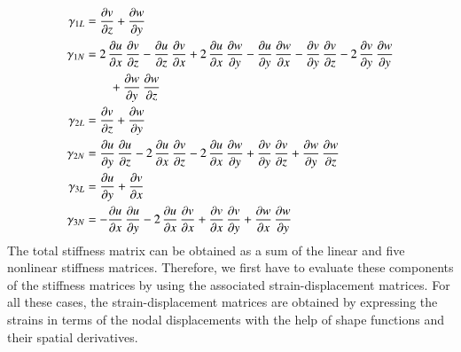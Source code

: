 \begin{subequations}
\begin{align}
	  \gamma_{1L} & =  {\frac{\partial v}{\partial z}} +  {\frac{\partial w}{\partial y}}\\
	  \gamma_{1N} & = 2 \,  {\frac{\partial u}{\partial x}}\,  {\frac{\partial v}{\partial z}} -  {\frac{ \partial u}{\partial z}}\,  {\frac{ \partial v}{\partial x}} + 2 \,  {\frac{\partial u}{\partial x}}\,  {\frac{\partial w}{\partial y}} -  {\frac{\partial u}{\partial y}}\,  {\frac{\partial w}{\partial x}} -  {\frac{\partial v}{\partial y}}\,  {\frac{\partial v}{\partial z}}  - 2 \,  {\frac{\partial v}{\partial y}}\,  {\frac{\partial w}{\partial y}} \notag \\
	\mbox{} & \qquad +  {\frac{\partial w}{\partial y}}\,  {\frac{\partial w}{\partial z}}\\
	  \gamma_{2L} & =  {\frac{\partial v}{\partial z}} +  {\frac{\partial w}{\partial y}}\\
	  \gamma_{2N} & =  {\frac{\partial u}{\partial y}}\,  {\frac{\partial u}{\partial z}} - 2 \,  {\frac{ \partial u}{\partial x}}\,  {\frac{ \partial v}{\partial z}} - 2 \,  {\frac{\partial u}{\partial x}}\,  {\frac{\partial w}{\partial y}} +  {\frac{\partial v}{\partial y}}\,  {\frac{\partial v}{\partial z}} +  {\frac{\partial w}{\partial y}}\,  {\frac{\partial w}{\partial z}}\\
	  \gamma_{3L} & =  {\frac{\partial u}{\partial y}} +  {\frac{\partial v}{\partial x}}\\
	  \gamma_{3N} & = -  {\frac{\partial u}{\partial x}}\,  {\frac{\partial u}{\partial y}} - 2 \,  {\frac{ \partial u}{\partial x}}\,  {\frac{ \partial v}{\partial x}} +  {\frac{\partial v}{\partial x}}\,  {\frac{\partial v}{\partial y}} +  {\frac{\partial w}{\partial x}}\,  {\frac{\partial w}{\partial y}} 
	\end{align}
\end{subequations}
The total stiffness matrix can be obtained as a sum of the linear and five non\-linear stiffness matrices. Therefore, we first have to evaluate these components of the stiffness matrices by using the associated strain-displacement matrices. For all these cases, the strain-displacement matrices are obtained by expressing the strains in terms of the nodal displacements with the help of shape functions and their spatial derivatives.

